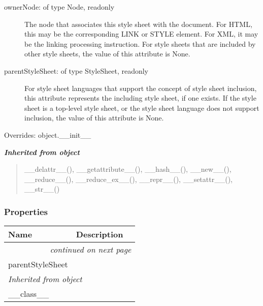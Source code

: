 \begin{boxedminipage}{\funcwidth}
\begin{description}
\item[{ownerNode: of type Node, readonly}] \leavevmode 
The node that associates this style sheet with the
document. For HTML, this may be the corresponding LINK
or STYLE element. For XML, it may be the linking
processing instruction. For style sheets that are
included by other style sheets, the value of this
attribute is None.

\item[{parentStyleSheet: of type StyleSheet, readonly}] \leavevmode 
For style sheet languages that support the concept
of style sheet inclusion, this attribute represents
the including style sheet, if one exists. If the style
sheet is a top-level style sheet, or the style sheet
language does not support inclusion, the value of this
attribute is None.

\end{description}
\setlength{\parskip}{1ex}
      Overrides: object.\_\_init\_\_

    \end{boxedminipage}


\large{\textbf{\textit{Inherited from object}}}

\begin{quote}
\_\_delattr\_\_(), \_\_getattribute\_\_(), \_\_hash\_\_(), \_\_new\_\_(), \_\_reduce\_\_(), \_\_reduce\_ex\_\_(), \_\_repr\_\_(), \_\_setattr\_\_(), \_\_str\_\_()
\end{quote}


  \subsubsection{Properties}

    \vspace{-1cm}
\hspace{\varindent}\begin{longtable}{|p{\varnamewidth}|p{\vardescrwidth}|l}
\cline{1-2}
\cline{1-2} \centering \textbf{Name} & \centering \textbf{Description}& \\
\cline{1-2}
\endhead\cline{1-2}\multicolumn{3}{r}{\small\textit{continued on next page}}\\\endfoot\cline{1-2}
\endlastfoot\raggedright p\-a\-r\-e\-n\-t\-S\-t\-y\-l\-e\-S\-h\-e\-e\-t\- & &\\
\cline{1-2}
\multicolumn{2}{|l|}{\textit{Inherited from object}}\\
\multicolumn{2}{|p{\varwidth}|}{\raggedright \_\_class\_\_}\\
\cline{1-2}
\end{longtable}

